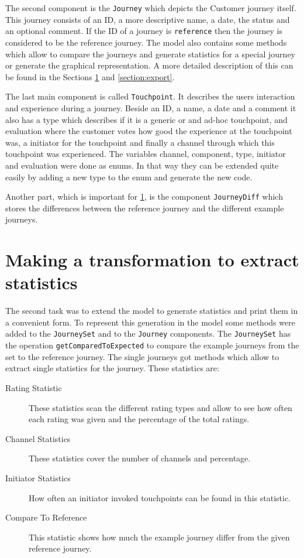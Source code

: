 \documentclass[12pt]{scrartcl}
\begin{document}
The second component is the \lstinline!Journey! which depicts the Customer journey itself. This journey consists of 
an ID, a more descriptive name, a date, the status and an optional comment. If the ID of a journey is 
\lstinline!reference! then the journey is considered to be the reference journey. The model also contains some 
methods which allow to compare the journeys and generate statistics for a special journey or generate the graphical
representation. A more detailed description of this can be found in the Sections \ref{section:statistic} and
\ref{section:export}.

The last main component is called \lstinline!Touchpoint!. It describes the users interaction and experience during
a journey. Beside an ID, a name, a date and a comment it also has a type which describes if it is a generic or
and ad-hoc touchpoint, and evaluation where the customer votes how good the experience at the touchpoint was, a 
initiator for the touchpoint and finally a channel through which this touchpoint was experienced. The variables
channel, component, type, initiator and evaluation were done as enums. In that way they can be extended quite
easily by adding a new type to the enum and generate the new code.

Another part, which is important for \ref{section:statistic}, is the component \lstinline!JourneyDiff! which stores
the differences between the reference journey and the different example journeys.

\section{Making a transformation to extract statistics} 
\label{section:statistic}

The second task was to extend the model to generate statistics and print them in a convenient form. To represent
this generation in the model some methods were added to the \lstinline!JourneySet! and to the \lstinline!Journey!
components. The \lstinline!JourneySet! has the operation \lstinline!getComparedToExpected! to compare the example 
journeys from the set to the reference journey. The single journeys got methods which allow to extract single
statistics for the journey. These statistics are:
\begin{description}
	\item[Rating Statistic] These statistics scan the different rating types and allow to see how often each rating
	was given and the percentage of the total ratings.
	\item[Channel Statistics] These statistics cover the number of channels and percentage.
	\item[Initiator Statistics] How often an initiator invoked touchpoints can be found in this statistic.
	\item[Compare To Reference] This statistic shows how much the example journey differ from the given reference
	journey.
\end{description}
\end{document}
